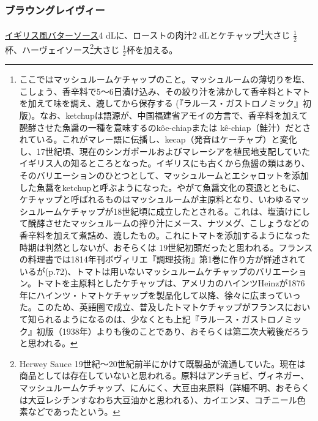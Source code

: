 \begin{recette}
\atoaki{}

\hypertarget{brown-gravy}{%
\subsubsection{ブラウングレイヴィー}\label{brown-gravy}}



\protect\hyperlink{butter-sauce}{イギリス風バターソース}4
dLに、ローストの肉汁2 dLとケチャップ\footnote{ここではマッシュルームケチャップのこと。マッシュルームの薄切りを塩、こしょう、香辛料で5〜6日漬け込み、その絞り汁を沸かして香辛料とトマトを加えて味を調え、漉してから保存する
  (『ラルース・ガストロノミック』初版)。なお、ketchupは語源が、中国福建省アモイの方言で、香辛料を加えて醗酵させた魚醤の一種を意味するのkôe-chiapまたは
  kê-chiap（鮭汁）だとされている。これがマレー語に伝播し、kecap（発音はケーチャプ）と変化し、17世紀頃、現在のシンガポールおよびマレーシアを植民地支配していたイギリス人の知るところとなった。イギリスにも古くから魚醤の類はあり、そのバリエーションのひとつとして、マッシュルームとエシャロットを添加した魚醤をketchupと呼ぶようになった。やがて魚醤文化の衰退とともに、ケチャップと呼ばれるものはマッシュルームが主原料となり、いわゆるマッシュルームケチャップが18世紀頃に成立したとされる。これは、塩漬けにして醗酵させたマッシュルームの搾り汁にメース、ナツメグ、こしょうなどの香辛料を加えて煮詰め、漉したもの。これにトマトを添加するようになった時期は判然としないが、おそらくは
  19世紀初頭だったと思われる。フランスの料理書では1814年刊ボヴィリエ『調理技術』第1巻に作り方が詳述されているが(p.72)、トマトは用いないマッシュルームケチャップのバリエーション。トマトを主原料としたケチャップは、アメリカのハインツHeinzが1876年にハインツ・トマトケチャップを製品化して以降、徐々に広まっていった。このため、英語圏で成立、普及したトマトケチャップがフランスにおいて知られるようになるのは、少なくとも上記『ラルース・ガストロノミック』初版（1938年）よりも後のことであり、おそらくは第二次大戦後だろうと思われる。}大さじ
\(\frac{1}{2}\)杯、ハーヴェイソース\footnote{Herwey Sauce
  19世紀〜20世紀前半にかけて既製品が流通していた。現在は商品としては存在していないと思われる。原料はアンチョビ、ヴィネガー、マッシュルームケチャップ、にんにく、大豆由来原料（詳細不明、おそらくは大豆レシチンすなわち大豆油かと思われる）、カイエンヌ、コチニール色素などであったという。}大さじ
\(\frac{1}{2}\)杯を加える。


\end{recette}
